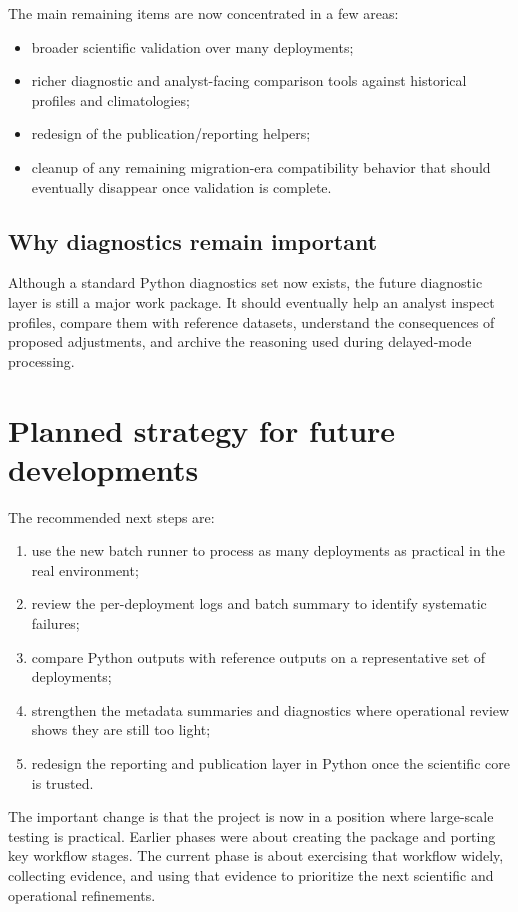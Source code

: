\documentclass[11pt,a4paper]{article}
\begin{document}
The main remaining items are now concentrated in a few areas:

\begin{itemize}[leftmargin=1.5em]
  \item broader scientific validation over many deployments;
  \item richer diagnostic and analyst-facing comparison tools against historical profiles and climatologies;
  \item redesign of the publication/reporting helpers;
  \item cleanup of any remaining migration-era compatibility behavior that should eventually disappear once validation is complete.
\end{itemize}

\subsection{Why diagnostics remain important}

Although a standard Python diagnostics set now exists, the future diagnostic layer is still a major work package. It should eventually help an analyst inspect profiles, compare them with reference datasets, understand the consequences of proposed adjustments, and archive the reasoning used during delayed-mode processing.

\section{Planned strategy for future developments}

The recommended next steps are:

\begin{enumerate}[leftmargin=1.6em]
  \item use the new batch runner to process as many deployments as practical in the real environment;
  \item review the per-deployment logs and batch summary to identify systematic failures;
  \item compare Python outputs with reference outputs on a representative set of deployments;
  \item strengthen the metadata summaries and diagnostics where operational review shows they are still too light;
  \item redesign the reporting and publication layer in Python once the scientific core is trusted.
\end{enumerate}

The important change is that the project is now in a position where large-scale testing is practical. Earlier phases were about creating the package and porting key workflow stages. The current phase is about exercising that workflow widely, collecting evidence, and using that evidence to prioritize the next scientific and operational refinements.
\end{document}
